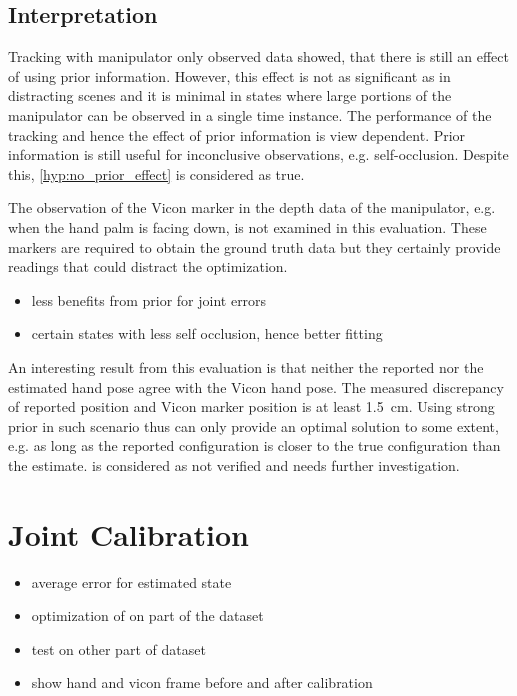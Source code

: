 \subsection{Interpretation}

Tracking with manipulator only observed data showed, that there is still an effect of using prior information. However, this effect is not as significant as in distracting scenes and it is minimal in states where large portions of the manipulator can be observed in a single time instance. The performance of the tracking and hence the effect of prior information is view dependent. Prior information is still useful for inconclusive observations, e.g. self-occlusion. Despite this, \cref{hyp:no_prior_effect} is considered as true.

The observation of the Vicon marker in the depth data of the manipulator, e.g. when the hand palm is facing down, is not examined in this evaluation. These markers are required to obtain the ground truth data but they certainly provide  readings that could distract the optimization.

\begin{itemize}
\item less benefits from prior for joint errors
\item certain states with less self occlusion, hence better fitting
\end{itemize}

An interesting result from this evaluation is that neither the reported nor the estimated hand pose agree with the Vicon hand pose. The measured discrepancy of reported position and Vicon marker position is at least \SI{1.5}{\cm}. Using strong prior in such scenario thus can only provide an optimal solution to some extent, e.g. as long as the reported configuration is closer to the true configuration than the estimate.  is considered as not verified and needs further investigation.


\section{Joint Calibration}

\begin{itemize}
\item average error for estimated state
\item optimization of on part of the dataset
\item test on other part of dataset
\item show hand and vicon frame before and after calibration
\end{itemize}

